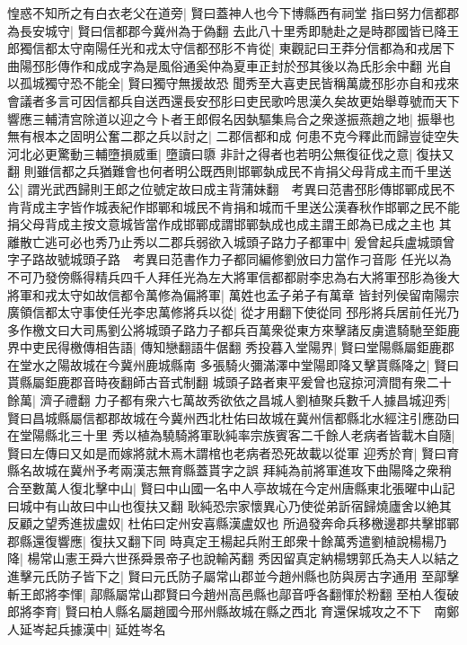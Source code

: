 惶惑不知所之有白衣老父在道旁|{
	賢曰蓋神人也今下博縣西有祠堂}
指曰努力信都郡為長安城守|{
	賢曰信都郡今冀州為于偽翻}
去此八十里秀即馳赴之是時郡國皆已降王郎獨信都太守南陽任光和戎太守信都邳肜不肯從|{
	東觀記曰王莽分信都為和戎居下曲陽邳肜傳作和成成字為是風俗通奚仲為夏車正封於邳其後以為氏肜余中翻}
光自以孤城獨守恐不能全|{
	賢曰獨守無援故恐}
聞秀至大喜吏民皆稱萬歲邳肜亦自和戎來會議者多言可因信都兵自送西還長安邳肜曰吏民歌吟思漢久矣故更始舉尊號而天下響應三輔清宫除道以迎之今卜者王郎假名因埶驅集烏合之衆遂振燕趙之地|{
	振舉也}
無有根本之固明公奮二郡之兵以討之|{
	二郡信都和成}
何患不克今釋此而歸豈徒空失河北必更驚動三輔墮損威重|{
	墮讀曰隳}
非計之得者也若明公無復征伐之意|{
	復扶又翻}
則雖信都之兵猶難會也何者明公既西則邯鄲埶成民不肯捐父母背成主而千里送公|{
	謂光武西歸則王郎之位號定故曰成主背蒲妹翻　考異曰范書邳肜傳邯鄲成民不肯背成主字皆作城表紀作邯鄲和城民不肯捐和城而千里送公漢春秋作邯鄲之民不能捐父母背成主按文意城皆當作成邯鄲成謂邯鄲埶成也成主謂王郎為已成之主也}
其離散亡逃可必也秀乃止秀以二郡兵弱欲入城頭子路力子都軍中|{
	爰曾起兵盧城頭曾字子路故號城頭子路　考異曰范書作力子都同編修劉攽曰力當作刁音彫}
任光以為不可乃發傍縣得精兵四千人拜任光為左大將軍信都都尉李忠為右大將軍邳肜為後大將軍和戎太守如故信都令萬修為偏將軍|{
	萬姓也孟子弟子有萬章}
皆封列侯留南陽宗廣領信都太守事使任光李忠萬修將兵以從|{
	從才用翻下使從同}
邳彤將兵居前任光乃多作檄文曰大司馬劉公將城頭子路力子都兵百萬衆從東方來擊諸反虜遣騎馳至鉅鹿界中吏民得檄傳相告語|{
	傳知戀翻語牛倨翻}
秀投暮入堂陽界|{
	賢曰堂陽縣屬鉅鹿郡在堂水之陽故城在今冀州鹿城縣南}
多張騎火彌滿澤中堂陽即降又擊貰縣降之|{
	賢曰貰縣屬鉅鹿郡音時夜翻師古音式制翻}
城頭子路者東平爰曾也寇掠河濟間有衆二十餘萬|{
	濟子禮翻}
力子都有衆六七萬故秀欲依之昌城人劉植聚兵數千人據昌城迎秀|{
	賢曰昌城縣屬信都郡故城在今冀州西北杜佑曰故城在冀州信都縣北水經注引應劭曰在堂陽縣北三十里}
秀以植為驍騎將軍耿純率宗族賓客二千餘人老病者皆載木自隨|{
	賢曰左傳曰又如是而嫁將就木焉木謂棺也老病者恐死故載以從軍}
迎秀於育|{
	賢曰育縣名故城在冀州予考兩漢志無育縣蓋貰字之誤}
拜純為前將軍進攻下曲陽降之衆稍合至數萬人復北擊中山|{
	賢曰中山國一名中人亭故城在今定州唐縣東北張曜中山記曰城中有山故曰中山也復扶又翻}
耿純恐宗家懷異心乃使從弟訢宿歸燒廬舍以絶其反顧之望秀進拔盧奴|{
	杜佑曰定州安喜縣漢盧奴也}
所過發奔命兵移檄邊郡共擊邯鄲郡縣還復響應|{
	復扶又翻下同}
時真定王楊起兵附王郎衆十餘萬秀遣劉植說楊楊乃降|{
	楊常山憲王舜六世孫舜景帝子也說輸芮翻}
秀因留真定納楊甥郭氏為夫人以結之進擊元氏防子皆下之|{
	賢曰元氏防子屬常山郡並今趙州縣也防與房古字通用}
至鄗擊斬王郎將李惲|{
	鄗縣屬常山郡賢曰今趙州高邑縣也鄗音呼各翻惲於粉翻}
至柏人復破郎將李育|{
	賢曰柏人縣名屬趙國今邢州縣故城在縣之西北}
育還保城攻之不下　南鄭人延岑起兵據漢中|{
	延姓岑名}
